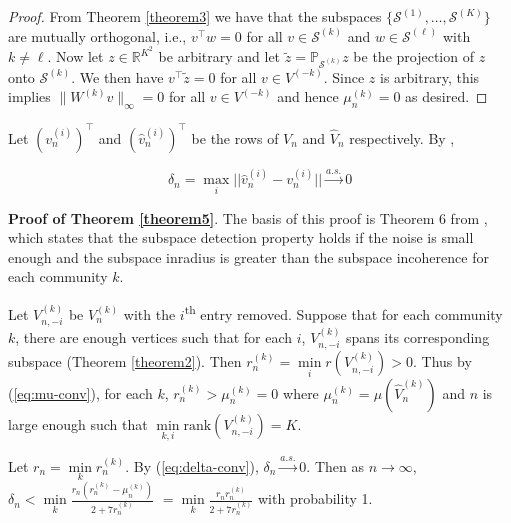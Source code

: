 \documentclass[12pt]{article}
\begin{document}
\begin{proof} From Theorem \ref{theorem3} we have that the subspaces
  $\{\mathcal{S}^{(1)}, \dots, \mathcal{S}^{(K)}\}$
  are mutually orthogonal, i.e., $v^{\top} w = 0$ for all $v \in
  \mathcal{S}^{(k)}$ and $w \in \mathcal{S}^{(\ell)}$ with $k \not =
  \ell$. Now let $z \in \mathbb{R}^{K^2}$ be arbitrary and let
  $\tilde{z} = \mathbb{P}_{\mathcal{S}^{(k)}} z$ be the projection of
    $z$ onto $\mathcal{S}^{(k)}$. We then have $v^{\top} \tilde{z} =
    0$ for all $v \in V^{(-k)}$. Since $z$ is arbitrary, this implies $\|W^{(k)} v\|_{\infty} = 0$ for all $v
    \in V^{(-k)}$ and hence $\mu_n^{(k)} = 0$ as desired.
\end{proof}

\begin{lemma}
\label{lemma3}
Let $(v_n^{(i)})^\top$ and $(\hat{v}_n^{(i)})^\top$ be the rows of $V_n$ and
$\hat{V}_n$ respectively. By \citeauthor{rubindelanchy2017statistical}, 

\begin{equation} \label{eq:delta-conv}
\delta_n = \max_i ||\hat{v}_n^{(i)} - v_n^{(i)}|| \stackrel{a.s.}{\to} 0
\end{equation}
\end{lemma}

\textbf{Proof of Theorem \ref{theorem5}}. The basis of this proof is
Theorem 6 from \citeauthor{jmlr-v28-wang13}, which states that the
subspace detection property holds if the noise is small enough and the
subspace inradius is greater than the subspace incoherence for each
community \(k\).

Let \(V_{n, -i}^{(k)}\) be \(V_n^{(k)}\) with the
\(i\)\textsuperscript{th} entry removed. Suppose that for each community
\(k\), there are enough vertices such that for each \(i\),
\(V_{n, -i}^{(k)}\) spans its corresponding subspace (Theorem
\ref{theorem2}). Then
\(r_n^{(k)} = \min\limits_i r(V_{n, -i}^{(k)}) > 0\). Thus by
(\ref{eq:mu-conv}), for each \(k\), \(r_n^{(k)} > \mu_n^{(k)} = 0\)
where \(\mu_n^{(k)} = \mu(\hat{V}_n^{(k)})\) and \(n\) is large enough
such that \(\min\limits_{k, i} \text{rank}(V_{n, -i}^{(k)}) = K\).

Let \(r_n = \min\limits_k r_n^{(k)}\). By (\ref{eq:delta-conv}),
\(\delta_n \stackrel{a.s.}{\to} 0\). Then as \(n\to \infty\),
\(\delta_n < \min\limits_k \frac{r_n (r_n^{(k)} - \mu_n^{(k)})}{2 + 7 r_n^{(k)}}\)
\(= \min\limits_k \frac{r_n r_n^{(k)}}{2 + 7 r_n^{(k)}}\) with
probability 1.
\end{document}
